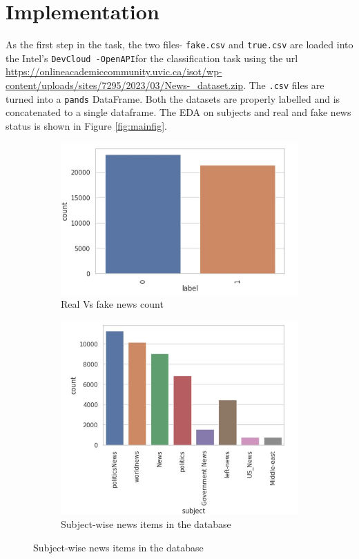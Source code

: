\documentclass{josis}
\begin{document}
\section{Implementation}
As the first step in the task, the two files- {\texttt{fake.csv}} and {\texttt{true.csv}} are loaded into  the Intel's {\texttt{DevCloud -OpenAPI}}for the classification task using the url \url{https://onlineacademiccommunity.uvic.ca/isot/wp-content/uploads/sites/7295/2023/03/News-_dataset.zip}. The {\texttt{.csv}} files are turned into a {\texttt{pands}} DataFrame. Both the datasets are properly labelled and is concatenated to a single dataframe. The EDA on subjects and real and fake news status is shown in Figure \ref{fig:mainfig}.
\begin{figure}
    \centering
    
    \begin{subfigure}[b]{0.45\textwidth}
        \centering
        \includegraphics[width=\textwidth]{real_vs_fake.JPG}
        \caption{Real Vs fake news count}
        \label{fig:subfig1}
    \end{subfigure}
    \hfill
    \begin{subfigure}[b]{0.45\textwidth}
        \centering
        \includegraphics[width=\textwidth]{subject_wise_news}
        \caption{Subject-wise news items in the database}
        \label{fig:subfig2}
    \end{subfigure}
    

\end{figure}
\end{document}

